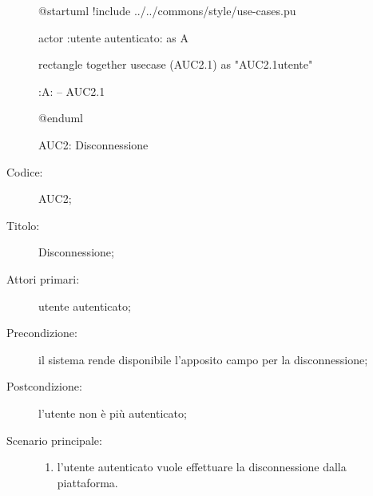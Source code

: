 \documentclass[../../../analisi-dei-requisiti.tex]{subfiles}
\begin{document}
\begin{figure}[H]
  \centering
  \begin{plantuml}
  @startuml
  !include ../../commons/style/use-cases.pu

  actor :utente autenticato: as A

  rectangle {
    together {
      usecase (AUC2.1) as "AUC2.1\nDisconnessione utente"
    }
  }

  :A: -- AUC2.1

  @enduml
  \end{plantuml}
  \caption{AUC2: Disconnessione}%
  \label{fig:AUC2}
\end{figure}

\begin{description}
  \item[Codice:] AUC2;
  \item[Titolo:] Disconnessione;
  \item[Attori primari:] utente autenticato;
  \item[Precondizione:] il sistema rende disponibile l'apposito campo per la disconnessione;
  \item[Postcondizione:] l'utente non è più autenticato;
  \item[Scenario principale:]
  \begin{enumerate}
    \item l'utente autenticato vuole effettuare la disconnessione dalla piattaforma.
  \end{enumerate}
\end{description}
\end{document}
